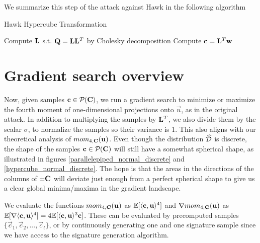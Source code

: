 We summarize this step of the attack against Hawk in the following algorithm

\begin{algorithm}
\caption{Hawk Hypercube Transformation}
\begin{algorithmic}[1]
    \State Compute $\mathbf{L}$ s.t. $\mathbf{Q} = \mathbf{L}\mathbf{L}^T$ \Comment by Cholesky decomposition
    \State Compute $\mathbf{c} = \mathbf{L}^T \mathbf{w}$
    \State {}
\end{algorithmic}
\end{algorithm}

\section{Gradient search overview}

Now, given samples $\mathbf{c} \in \mathcal{P}_{}(\mathbf{C})$, we run a gradient search to minimize or maximize the fourth moment of one-dimensional projections onto $\vec{u}$, as in the original attack. In addition to multiplying the samples by $\mathbf{L}^T$, we also divide them by the scalar $\sigma$, to normalize the samples
so their variance is $1$. This also aligns with our theoretical analysis of $mom_{4,\mathbf{C}}(\mathbf{u})$. Even though the distribution $\widehat{\mathcal{D}}$ is discrete, the shape of the samples $\mathbf{c} \in \mathcal{P}_{}(\mathbf{C})$ will still have a somewhat spherical shape,
as illustrated in figures \ref{parallelepiped_normal_discrete} and \ref{hypercube_normal_discrete}.
The hope is that the areas in the directions of the columns of $\pm \mathbf{C}$ will deviate just enough from a perfect spherical shape to give us a clear global minima/maxima in the gradient landscape.

We evaluate the functions $mom_{4, \mathbf{C}}(\mathbf{u})$ as $\mathbb{E} [\langle \mathbf{c}, \mathbf{u} \rangle ^4]$ and $\nabla mom_{4,\mathbf{C}}(\mathbf{u})$ as $\mathbb{E} [\nabla \langle \mathbf{c}, \mathbf{u} \rangle ^4] = 4 \mathbb{E} [\langle \mathbf{c}, \mathbf{u} \rangle ^3 \mathbf{c}]$.
These can be evaluated by precomputed samples $\{\vec{c}_1, \vec{c}_2, ..., \vec{c}_t\}$, or by continuously generating one and one signature sample since we have access to the signature generation algorithm.

